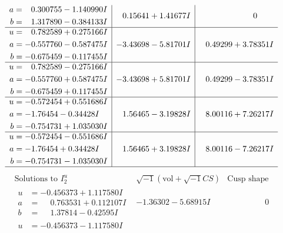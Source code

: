 \documentclass[1p]{elsarticle_modified}
\theoremstyle{definition}
\newcommand{\I}{\sqrt{-1}}
\begin{document}
$$\begin{array}{c|c|c}
\begin{aligned}
a &= \phantom{-}0.300755 - 1.140990 I \\
b &= \phantom{-}1.317890 - 0.384133 I\end{aligned}
 & \phantom{-}0.15641 + 1.41677 I & \phantom{-0.000000 } 0 \\ \hline\begin{aligned}
u &= \phantom{-}0.782589 + 0.275166 I \\
a &= -0.557760 - 0.587475 I \\
b &= -0.675459 - 0.117455 I\end{aligned}
 & -3.43698 - 5.81701 I & \phantom{-}0.49299 + 3.78351 I \\ \hline\begin{aligned}
u &= \phantom{-}0.782589 - 0.275166 I \\
a &= -0.557760 + 0.587475 I \\
b &= -0.675459 + 0.117455 I\end{aligned}
 & -3.43698 + 5.81701 I & \phantom{-}0.49299 - 3.78351 I \\ \hline\begin{aligned}
u &= -0.572454 + 0.551686 I \\
a &= -1.76454 - 0.34428 I \\
b &= -0.754731 + 1.035030 I\end{aligned}
 & \phantom{-}1.56465 - 3.19828 I & \phantom{-}8.00116 + 7.26217 I \\ \hline\begin{aligned}
u &= -0.572454 - 0.551686 I \\
a &= -1.76454 + 0.34428 I \\
b &= -0.754731 - 1.035030 I\end{aligned}
 & \phantom{-}1.56465 + 3.19828 I & \phantom{-}8.00116 - 7.26217 I\\
 \hline 
 \end{array}$$\newpage$$\begin{array}{c|c|c}  
\text{Solutions to }I^u_{2}& \I (\text{vol} + \sqrt{-1}CS) & \text{Cusp shape}\\
 \hline 
\begin{aligned}
u &= -0.456373 + 1.117580 I \\
a &= \phantom{-}0.763531 + 0.112107 I \\
b &= \phantom{-}1.37814 - 0.42595 I\end{aligned}
 & -1.36302 - 5.68915 I & \phantom{-0.000000 } 0 \\ \hline\begin{aligned}
u &= -0.456373 - 1.117580 I \\

\end{aligned}
\end{array}$$
\end{document}
